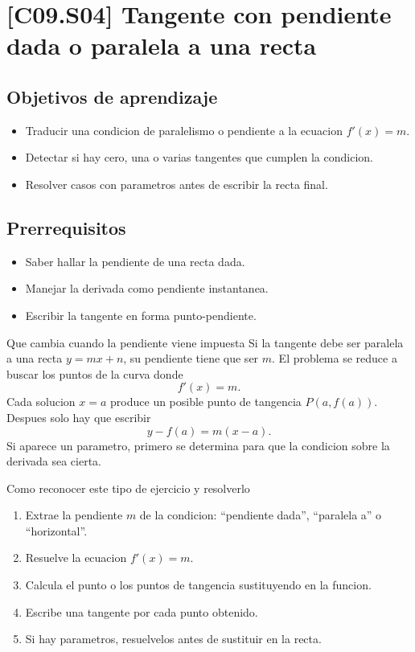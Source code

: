 \section{[C09.S04] Tangente con pendiente dada o paralela a una recta}

\subsection*{Objetivos de aprendizaje}
\begin{itemize}
  \item Traducir una condicion de paralelismo o pendiente a la ecuacion \(f'(x)=m\).
  \item Detectar si hay cero, una o varias tangentes que cumplen la condicion.
  \item Resolver casos con parametros antes de escribir la recta final.
\end{itemize}

\subsection*{Prerrequisitos}
\begin{itemize}
  \item Saber hallar la pendiente de una recta dada.
  \item Manejar la derivada como pendiente instantanea.
  \item Escribir la tangente en forma punto-pendiente.
\end{itemize}

\begin{theorybox}{Que cambia cuando la pendiente viene impuesta}
Si la tangente debe ser paralela a una recta \(y=mx+n\), su pendiente tiene que ser \(m\). El
problema se reduce a buscar los puntos de la curva donde
\[
f'(x)=m.
\]
Cada solucion \(x=a\) produce un posible punto de tangencia \(P(a,f(a))\). Despues solo hay
que escribir
\[
y-f(a)=m(x-a).
\]
Si aparece un parametro, primero se determina para que la condicion sobre la derivada sea
cierta.
\end{theorybox}

\begin{methodbox}{Como reconocer este tipo de ejercicio y resolverlo}
\begin{enumerate}
  \item Extrae la pendiente \(m\) de la condicion: ``pendiente dada'', ``paralela a'' o
  ``horizontal''.
  \item Resuelve la ecuacion \(f'(x)=m\).
  \item Calcula el punto o los puntos de tangencia sustituyendo en la funcion.
  \item Escribe una tangente por cada punto obtenido.
  \item Si hay parametros, resuelvelos antes de sustituir en la recta.
\end{enumerate}
\end{methodbox}

